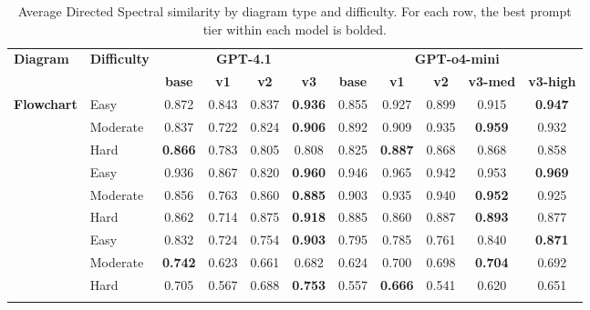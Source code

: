\begin{table}[t]
\centering
\caption{Average Directed Spectral similarity by diagram type and difficulty. For each row, the best prompt tier within each model is bolded.}
\label{tab:spectral_by_type_difficulty}
\begin{tabular}{llccccccccc}
\toprule
\textbf{Diagram} & \textbf{Difficulty} & \multicolumn{4}{c}{\textbf{GPT-4.1}} & \multicolumn{5}{c}{\textbf{GPT-o4-mini}} \\
\cmidrule(lr){3-6}\cmidrule(lr){7-11}
& & \textbf{base} & \textbf{v1} & \textbf{v2} & \textbf{v3} & \textbf{base} & \textbf{v1} & \textbf{v2} & \textbf{v3-med} & \textbf{v3-high} \\
\midrule
\multirow{3}{*}{\textbf{Flowchart}} & Easy & 0.872 & 0.843 & 0.837 & \textbf{0.936} & 0.855 & 0.927 & 0.899 & 0.915 & \textbf{0.947} \\
 & Moderate & 0.837 & 0.722 & 0.824 & \textbf{0.906} & 0.892 & 0.909 & 0.935 & \textbf{0.959} & 0.932 \\
 & Hard & \textbf{0.866} & 0.783 & 0.805 & 0.808 & 0.825 & \textbf{0.887} & 0.868 & 0.868 & 0.858 \\
\addlinespace
\multirow{3}{*}{\textbf{Graph}} & Easy & 0.936 & 0.867 & 0.820 & \textbf{0.960} & 0.946 & 0.965 & 0.942 & 0.953 & \textbf{0.969} \\
 & Moderate & 0.856 & 0.763 & 0.860 & \textbf{0.885} & 0.903 & 0.935 & 0.940 & \textbf{0.952} & 0.925 \\
 & Hard & 0.862 & 0.714 & 0.875 & \textbf{0.918} & 0.885 & 0.860 & 0.887 & \textbf{0.893} & 0.877 \\
\addlinespace
\multirow{3}{*}{\textbf{State Diagram}} & Easy & 0.832 & 0.724 & 0.754 & \textbf{0.903} & 0.795 & 0.785 & 0.761 & 0.840 & \textbf{0.871} \\
 & Moderate & \textbf{0.742} & 0.623 & 0.661 & 0.682 & 0.624 & 0.700 & 0.698 & \textbf{0.704} & 0.692 \\
 & Hard & 0.705 & 0.567 & 0.688 & \textbf{0.753} & 0.557 & \textbf{0.666} & 0.541 & 0.620 & 0.651 \\
\addlinespace
\bottomrule
\end{tabular}
\end{table}